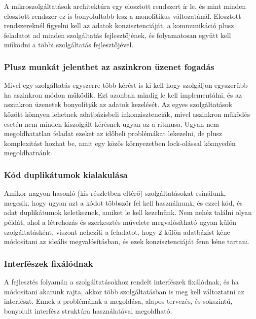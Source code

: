 \documentclass[11pt,magyar,a4paper,twoside,]{report}
\begin{document}
A mikroszolgáltatások architektúra egy elosztott rendszert ír le, és
mint minden elosztott rendszer ez is bonyolultabb lesz a monolitikus
változatánál. Elosztott rendszereknél figyelni kell az adatok
konzisztenciáját, a kommunikáció plusz feladatot ad minden szolgáltatás
fejlesztőjének, és folyamatosan együtt kell működni a többi szolgáltatás
fejlesztőjével.

\subsubsection{Plusz munkát jelenthet az aszinkron üzenet
fogadás}\label{plusz-munkuxe1t-jelenthet-az-aszinkron-uxfczenet-fogaduxe1s}

Mivel egy szolgáltatás egyszerre több kérést is ki kell hogy szolgáljon
egyszerűbb ha aszinkron módon működik. Ezt azonban mindig le kell
implementálni, és az aszinkron üzenetek bonyolítják az adatok kezelését.
Az egyes szolgáltatások között könnyen lehetnek adatbázisbeli
inkonzisztenciák, mivel aszinkron működés esetén nem minden kiszolgált
kérésnek ugyan az a ritmusa. Ugyan nem megoldhatatlan feladat ezeket az
időbeli problémákat lekezelni, de plusz komplexitást hozhat be, amit egy
közös környezetben lock-olással könnyedén megoldhatnánk.

\subsubsection{Kód duplikátumok
kialakulása}\label{kuxf3d-duplikuxe1tumok-kialakuluxe1sa}

Amikor nagyon hasonló (kis részletben eltérő) szolgáltatásokat
csinálunk, megesik, hogy ugyan azt a kódot többször fel kell
használnunk, és ezzel kód, és adat duplikátumok keletkeznek, amiket le
kell kezelnünk. Nem nehéz találni olyan példát, ahol a létrehozás és
szerkesztés művelete megvalósítható ugyan külön szolgáltatásként,
viszont nehezíti a feladatot, hogy 2 külön adatbázist kéne módosítani az
ideális megvalósításban, és ezek konzisztenciáját fenn kéne tartani.

\subsubsection{Interfészek
fixálódnak}\label{interfuxe9szek-fixuxe1luxf3dnak}

A fejlesztés folyamán a szolgáltatásokhoz rendelt interfészek
fixálódnak, és ha módosítani akarunk rajta, akkor több szolgáltatásban
is meg kell változtatni az interfészt. Ennek a problémának a megoldása,
alapos tervezés, és sokszintű, bonyolult interfész struktúra
használatával megoldható.
\end{document}
